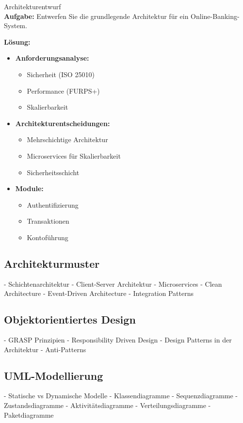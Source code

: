 \begin{example2}{Architekturentwurf}\\
\textbf{Aufgabe:} Entwerfen Sie die grundlegende Architektur für ein Online-Banking-System.

\textbf{Lösung:}
\begin{itemize}
    \item \textbf{Anforderungsanalyse:}
    \begin{itemize}
        \item Sicherheit (ISO 25010)
        \item Performance (FURPS+)
        \item Skalierbarkeit
    \end{itemize}
    
    \item \textbf{Architekturentscheidungen:}
    \begin{itemize}
        \item Mehrschichtige Architektur
        \item Microservices für Skalierbarkeit
        \item Sicherheitsschicht
    \end{itemize}
    
    \item \textbf{Module:}
    \begin{itemize}
        \item Authentifizierung
        \item Transaktionen
        \item Kontoführung
    \end{itemize}
\end{itemize}
\end{example2}

\pagebreak

\subsection{Architekturmuster}
- Schichtenarchitektur
- Client-Server Architektur 
- Microservices
- Clean Architecture
- Event-Driven Architecture
- Integration Patterns

\subsection{Objektorientiertes Design}
- GRASP Prinzipien
- Responsibility Driven Design
- Design Patterns in der Architektur
- Anti-Patterns

\subsection{UML-Modellierung}
- Statische vs Dynamische Modelle
- Klassendiagramme
- Sequenzdiagramme
- Zustandsdiagramme  
- Aktivitätsdiagramme
- Verteilungsdiagramme
- Paketdiagramme





